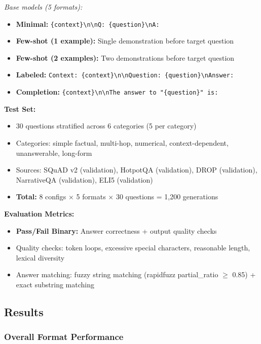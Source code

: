 \documentclass[11pt,a4paper]{article}
\begin{document}
\textit{Base models (5 formats):}
\begin{itemize}
\item \textbf{Minimal:} \texttt{\{context\}\textbackslash n\textbackslash nQ: \{question\}\textbackslash nA:}
\item \textbf{Few-shot (1 example):} Single demonstration before target question
\item \textbf{Few-shot (2 examples):} Two demonstrations before target question
\item \textbf{Labeled:} \texttt{Context: \{context\}\textbackslash n\textbackslash nQuestion: \{question\}\textbackslash nAnswer:}
\item \textbf{Completion:} \texttt{\{context\}\textbackslash n\textbackslash nThe answer to "\{question\}" is:}
\end{itemize}

\textbf{Test Set:}
\begin{itemize}
\item 30 questions stratified across 6 categories (5 per category)
\item Categories: simple factual, multi-hop, numerical, context-dependent, unanswerable, long-form
\item Sources: SQuAD v2 (validation), HotpotQA (validation), DROP (validation), NarrativeQA (validation), ELI5 (validation)
\item \textbf{Total:} 8 configs $\times$ 5 formats $\times$ 30 questions = 1,200 generations
\end{itemize}

\textbf{Evaluation Metrics:}
\begin{itemize}
\item \textbf{Pass/Fail Binary:} Answer correctness + output quality checks
\item Quality checks: token loops, excessive special characters, reasonable length, lexical diversity
\item Answer matching: fuzzy string matching (rapidfuzz partial\_ratio $\geq$ 0.85) + exact substring matching
\end{itemize}

\subsection{Results}

\subsubsection{Overall Format Performance}
\end{document}
